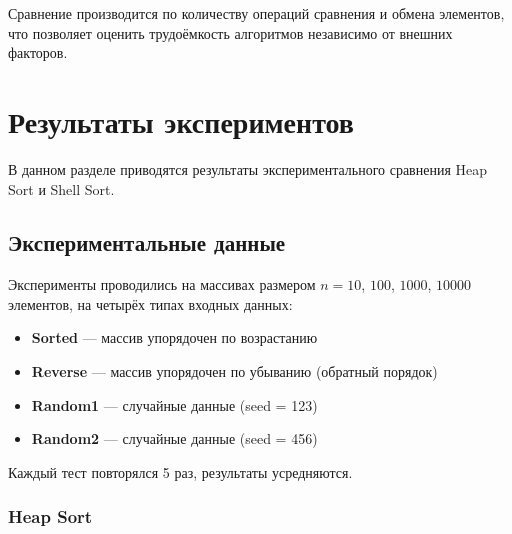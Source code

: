 \documentclass[a4paper,12pt,titlepage]{article}
\begin{document}
Сравнение производится по количеству операций сравнения и обмена элементов, что позволяет оценить трудоёмкость алгоритмов независимо от внешних факторов.

\newpage

\section{Результаты экспериментов}

В данном разделе приводятся результаты экспериментального сравнения Heap Sort и Shell Sort.

\subsection{Экспериментальные данные}

Эксперименты проводились на массивах размером $n = 10$, $100$, $1000$, $10000$ элементов, на четырёх типах входных данных:
\begin{itemize}
    \item \textbf{Sorted} — массив упорядочен по возрастанию
    \item \textbf{Reverse} — массив упорядочен по убыванию (обратный порядок)
    \item \textbf{Random1} — случайные данные (seed = 123)
    \item \textbf{Random2} — случайные данные (seed = 456)
\end{itemize}

Каждый тест повторялся 5 раз, результаты усредняются.

\subsubsection{Heap Sort}
\end{document}

